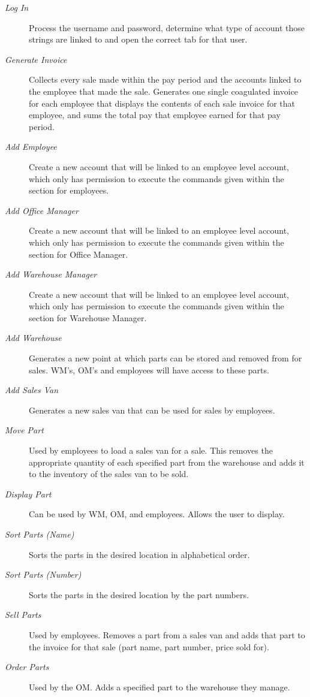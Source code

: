 \documentclass{report}
\begin{document}
\begin{description}
  \item [\textit{Log In}] Process the username and password, determine what type of account those strings are linked to and open the correct tab for that user.
  \item [\textit{Generate Invoice}] Collects every sale made within the pay period and the accounts linked to the employee that made the sale. Generates one single coagulated invoice for each employee that displays the contents of each sale invoice for that employee, and sums the total pay that employee earned for that pay period.
  \item [\textit{Add Employee}] Create a new account that will be linked to an employee level account, which only has permission to execute the commands given within the section for employees.
  \item [\textit{Add Office Manager}] Create a new account that will be linked to an employee level account, which only has permission to execute the commands given within the section for Office Manager.
  \item [\textit{Add Warehouse Manager}] Create a new account that will be linked to an employee level account, which only has permission to execute the commands given within the section for Warehouse Manager.
  \item [\textit{Add Warehouse}] Generates a new point at which parts can be stored and removed from for sales. WM’s, OM’s and employees will have access to these parts.
  \item [\textit{Add Sales Van}] Generates a new sales van that can be used for sales by employees.
  \item [\textit{Move Part}] Used by employees to load a sales van for a sale. This removes the appropriate quantity of each specified part from the warehouse and adds it to the inventory of the sales van to be sold.
  \item [\textit{Display Part}] Can be used by WM, OM, and employees. Allows the user to display.
  \item [\textit{Sort Parts (Name)}] Sorts the parts in the desired location in alphabetical order.
  \item [\textit{Sort Parts (Number)}] Sorts the parts in the desired location by the part numbers.
  \item [\textit{Sell Parts}] Used by employees. Removes a part from a sales van and adds that part to the invoice for that sale (part name, part number, price sold for).
  \item [\textit{Order Parts}] Used by the OM. Adds a specified part to the warehouse they manage.

\end{description}
\end{document}
